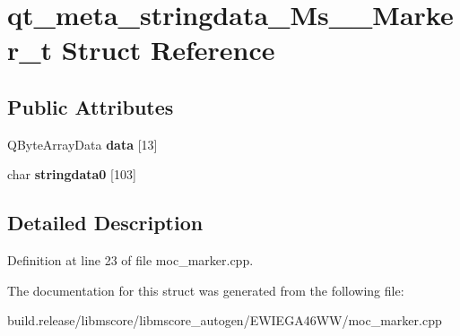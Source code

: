 \hypertarget{structqt__meta__stringdata___ms_____marker__t}{}\section{qt\+\_\+meta\+\_\+stringdata\+\_\+\+Ms\+\_\+\+\_\+\+Marker\+\_\+t Struct Reference}
\label{structqt__meta__stringdata___ms_____marker__t}
\subsection*{Public Attributes}
\begin{DoxyCompactItemize}
\item 
\mbox{\label{structqt__meta__stringdata___ms_____marker__t_aadb415aeea8313c3caca68bf37b03d3c}} 
Q\+Byte\+Array\+Data {\bfseries data} \mbox{[}13\mbox{]}
\item 
\mbox{\label{structqt__meta__stringdata___ms_____marker__t_ad96f50364d41c36645b7a54090044d2a}} 
char {\bfseries stringdata0} \mbox{[}103\mbox{]}
\end{DoxyCompactItemize}


\subsection{Detailed Description}


Definition at line 23 of file moc\+\_\+marker.\+cpp.



The documentation for this struct was generated from the following file\+:\begin{DoxyCompactItemize}
\item 
build.\+release/libmscore/libmscore\+\_\+autogen/\+E\+W\+I\+E\+G\+A46\+W\+W/moc\+\_\+marker.\+cpp\end{DoxyCompactItemize}
